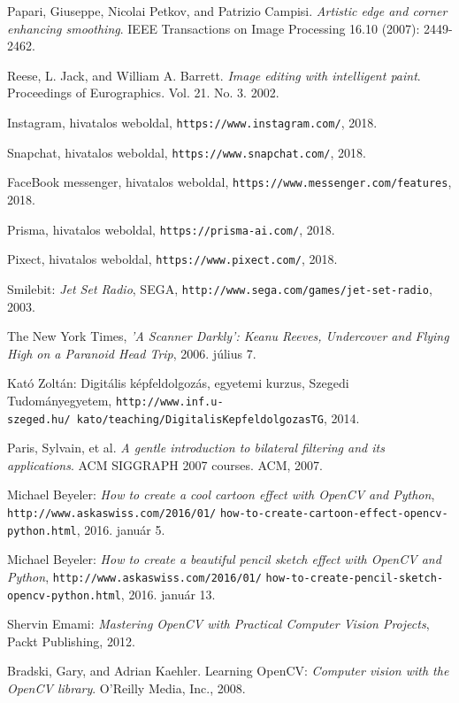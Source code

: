 
\begin{thebibliography}{x}

Papari, Giuseppe, Nicolai Petkov, and Patrizio Campisi. \emph{Artistic edge and corner enhancing smoothing}. IEEE Transactions on Image Processing 16.10 (2007): 2449-2462.

Reese, L. Jack, and William A. Barrett. \emph{Image editing with intelligent paint}. Proceedings of Eurographics. Vol. 21. No. 3. 2002.

Instagram, hivatalos weboldal, \texttt{https://www.instagram.com/}, 2018.

Snapchat, hivatalos weboldal, \texttt{https://www.snapchat.com/}, 2018.

FaceBook messenger, hivatalos weboldal, \texttt{https://www.messenger.com/features}, 2018.

Prisma, hivatalos weboldal, \texttt{https://prisma-ai.com/}, 2018.

Pixect, hivatalos weboldal, \texttt{https://www.pixect.com/}, 2018.

Smilebit: \emph{Jet Set Radio}, SEGA, \texttt{http://www.sega.com/games/jet-set-radio}, 2003.

The New York Times, \emph{'A Scanner Darkly': Keanu Reeves, Undercover and Flying High on a Paranoid Head Trip}, 2006. július 7.

Kató Zoltán: Digitális képfeldolgozás, egyetemi kurzus, Szegedi Tudományegyetem, \texttt{http://www.inf.u-szeged.hu/~kato/teaching/DigitalisKepfeldolgozasTG}, 2014.

Paris, Sylvain, et al. \emph{A gentle introduction to bilateral filtering and its applications}. ACM SIGGRAPH 2007 courses. ACM, 2007.

 Michael Beyeler: \emph{How to create a cool cartoon effect with OpenCV and Python}, \texttt{http://www.askaswiss.com/2016/01/} \texttt{how-to-create-cartoon-effect-opencv-python.html}, 2016. január 5.

 Michael Beyeler: \emph{How to create a beautiful pencil sketch effect with OpenCV and Python}, \texttt{http://www.askaswiss.com/2016/01/} \texttt{how-to-create-pencil-sketch-opencv-python.html}, 2016. január 13.

 Shervin Emami: \emph{Mastering OpenCV with Practical Computer Vision Projects}, Packt Publishing, 2012.

Bradski, Gary, and Adrian Kaehler. Learning OpenCV: \emph{Computer vision with the OpenCV library}. O'Reilly Media, Inc., 2008.


\end{thebibliography}
